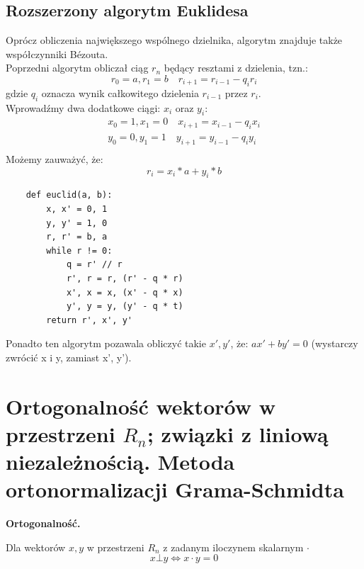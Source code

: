 \documentclass[12pt]{article}
\begin{document}
    \subsection{Rozszerzony algorytm Euklidesa}
    Oprócz obliczenia największego wspólnego dzielnika, algorytm znajduje także współczynniki Bézouta. \\
    Poprzedni algorytm obliczał ciąg $r_n$ będący resztami z dzielenia, tzn.:
    \[ r_0 = a, r_1 = b \quad r_{i + 1} = r_{i - 1} - q_{i}r_{i}\]
    gdzie $q_{i}$ oznacza wynik całkowitego dzielenia $r_{i - 1}$ przez $r_i$. \\
    Wprowadźmy dwa dodatkowe ciągi: $x_{i}$ oraz $y_i$:
    \begin{gather*}
        x_0 = 1, x_1 = 0 \quad x_{i + 1} = x_{i - 1} - q_{i}x_{i}\\
        y_0 = 0, y_1 = 1 \quad y_{i + 1} = y_{i - 1} - q_{i}y_{i}\\
    \end{gather*}
    Możemy zauważyć, że:
    \[r_i = x_i * a + y_i * b\]
    \begin{verbatim}
    def euclid(a, b):
        x, x' = 0, 1
        y, y' = 1, 0
        r, r' = b, a
        while r != 0:
            q = r' // r
            r', r = r, (r' - q * r)
            x', x = x, (x' - q * x)
            y', y = y, (y' - q * t)
        return r', x', y'
    \end{verbatim}
    Ponadto ten algorytm pozawala obliczyć takie $x', y'$, że: $ax' + by' = 0$ (wystarczy zwrócić x i y, zamiast x', y').

    \newpage

    \section{Ortogonalność wektorów w przestrzeni $R_n$; związki z liniową niezależnością. Metoda ortonormalizacji Grama-Schmidta}

    \begin{definition}
        \textbf{Ortogonalność.}

        Dla wektorów $x, y$ w przestrzeni $R_n$ z zadanym iloczynem skalarnym $\cdot$
        \[x \bot y \Leftrightarrow x \cdot y = 0 \]

    \end{definition}
\end{document}
